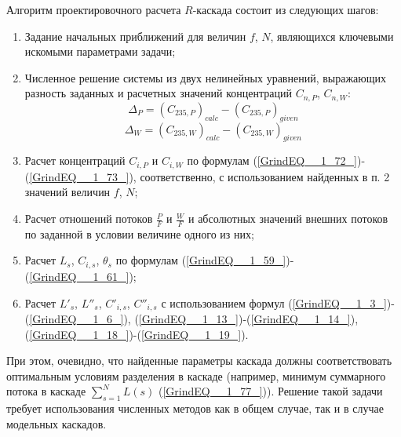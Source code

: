 Алгоритм проектировочного расчета $R$-каскада состоит из следующих шагов:

\begin{enumerate}
  \item Задание начальных приближений для величин $f$, $N$, являющихся ключевыми искомыми параметрами задачи; 
  \item Численное решение системы из двух нелинейных уравнений, выражающих разность заданных и расчетных значений концентраций $C_{n,P}$, $C_{n,W}$:
\begin{equation}
  \label{dis_235P}
  \Delta_{P} = {(C_{235, P})}_{calc}-{(C_{235, P})}_{given}
\end{equation}
\begin{equation}
  \label{dis_235W}
  \Delta_{W} = {(C_{235, W})}_{calc}-{(C_{235, W})}_{given}
\end{equation}
  \item Расчет концентраций $C_{i,P}$ и $C_{i,W}$ по формулам (\ref{GrindEQ__1_72_})-(\ref{GrindEQ__1_73_}), соответственно, с использованием найденных в п. 2 значений величин $f$, $N$;
  \item Расчет отношений потоков  $\frac{P}{F}$ и $\frac{W}{F}$ и абсолютных значений внешних потоков по заданной в условии величине одного из них; 
  \item Расчет $L_{s}$, $C_{i, s}$, $\theta_{s}$ по формулам (\ref{GrindEQ__1_59_})-(\ref{GrindEQ__1_61_});
  \item Расчет ${L'}_{s}$, ${L''}_{s}$, $C'_{i, s} $, $C''_{i, s}$ с использованием формул (\ref{GrindEQ__1_3_})-(\ref{GrindEQ__1_6_}), (\ref{GrindEQ__1_13_})-(\ref{GrindEQ__1_14_}), (\ref{GrindEQ__1_18_})-(\ref{GrindEQ__1_19_}).
\end{enumerate}

При этом, очевидно, что найденные параметры каскада должны соответствовать оптимальным условиям разделения в каскаде (например, минимум суммарного потока в каскаде $\sum _{s=1}^{N}L(s)$ (\ref{GrindEQ__1_77_})). Решение такой задачи требует использования численных методов как в общем случае, так и в случае модельных каскадов. 

